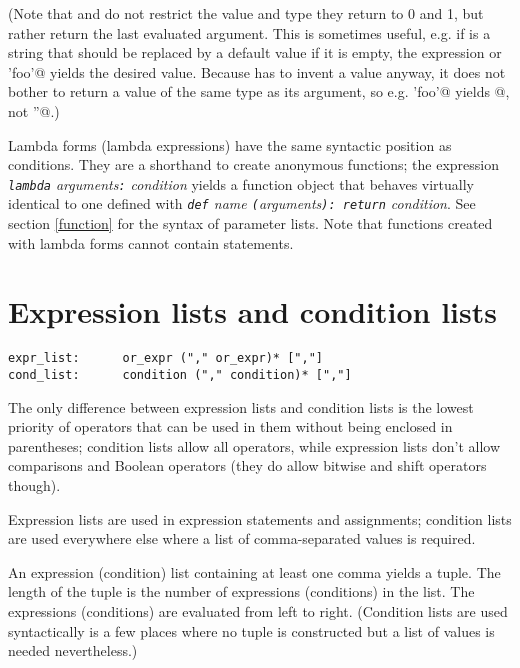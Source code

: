 (Note that \verb@and@ and \verb@or@ do not restrict the value and type
they return to 0 and 1, but rather return the last evaluated argument.
This is sometimes useful, e.g. if \verb@s@ is a string that should be
replaced by a default value if it is empty, the expression
\verb@s or 'foo'@ yields the desired value.  Because \verb@not@ has to
invent a value anyway, it does not bother to return a value of the
same type as its argument, so e.g. \verb@not 'foo'@ yields @,
not \verb@''@.)

Lambda forms (lambda expressions) have the same syntactic position as
conditions.  They are a shorthand to create anonymous functions; the
expression {\em {\tt lambda} arguments{\tt :} condition}
yields a function object that behaves virtually identical to one
defined with
{\em {\tt def} name {\tt (}arguments{\tt ): return} condition}.
See section \ref{function} for the syntax of
parameter lists.  Note that functions created with lambda forms cannot
contain statements.
\label{lambda}

\section{Expression lists and condition lists}

\begin{verbatim}
expr_list:      or_expr ("," or_expr)* [","]
cond_list:      condition ("," condition)* [","]
\end{verbatim}

The only difference between expression lists and condition lists is
the lowest priority of operators that can be used in them without
being enclosed in parentheses; condition lists allow all operators,
while expression lists don't allow comparisons and Boolean operators
(they do allow bitwise and shift operators though).

Expression lists are used in expression statements and assignments;
condition lists are used everywhere else where a list of
comma-separated values is required.

An expression (condition) list containing at least one comma yields a
tuple.  The length of the tuple is the number of expressions
(conditions) in the list.  The expressions (conditions) are evaluated
from left to right.  (Condition lists are used syntactically is a few
places where no tuple is constructed but a list of values is needed
nevertheless.)

